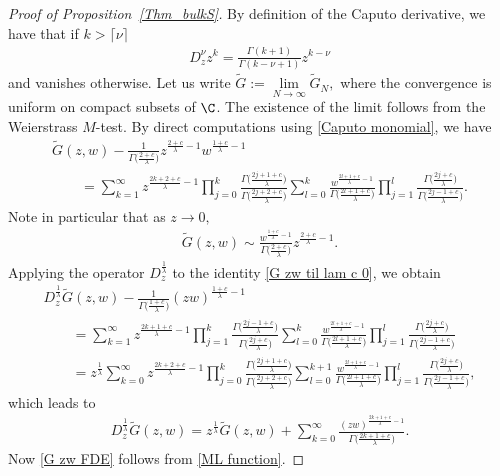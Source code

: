 \begin{proof}[Proof of Proposition~\ref{Thm_bulkS}]
	By definition of the Caputo derivative, we have that if $k>
	\lceil \nu \rceil$
	\begin{gather} \label{Caputo monomial}
		D_z^\nu z^k =\frac{\Gamma(k+1)}{\Gamma(k-\nu+1)}z^{k-\nu}
	\end{gather}
	and vanishes otherwise.
	Let us write $\widetilde{G}:=\lim\limits_{N \to \infty} \widetilde{G}_N,$ where the convergence is uniform on compact subsets of $\C$. The existence of the limit follows from the Weierstrass $M$-test.
	By direct computations using \eqref{Caputo monomial}, we have
	\begin{gather}
\widetilde{G}(z,w)-\frac{1}{\Gamma\big(\frac{2+c}{\lambda}\big)} z^{ \frac{2+c}{\lambda}-1 } w^{ \frac{1+c}{\lambda}-1 }
			\nonumber\\
\qquad{} =\sum_{k=1}^{\infty} z^{ \frac{2k+2+c}{\lambda}-1 } \prod_{j=0}^k \frac{ \Gamma\big( \frac{2j+1+c}{\lambda} \big) }{\Gamma\big( \frac{2j+2+c}{\lambda} \big)}
			\sum_{l=0}^{k} \frac{ w^{ \frac{2l+1+c}{\lambda}-1 } }{\Gamma\big( \frac{2l+1+c}{\lambda}\big)} \prod_{j=1}^l \frac{\Gamma\big( \frac{2j+c}{\lambda} \big)}{ \Gamma\big(\frac{2j-1+c}{\lambda}\big) } .\label{G zw til lam c 0}
		\end{gather}
	Note in particular that as $z\to 0,$
	\begin{gather} \label{G zw til asym}
		\widetilde{G}(z,w) \sim \frac{w^{ \frac{1+c}{\lambda}-1 } }{\Gamma\big(\frac{2+c}{\lambda}\big)} z^{ \frac{2+c}{\lambda}-1 }.
	\end{gather}
	Applying the operator $D_z^{ \frac{1}{\lambda} }$ to the identity \eqref{G zw til lam c 0}, we obtain
	\begin{gather*}
 D_z^{ \frac{1}{\lambda} } \widetilde{G}(z,w)-\frac{ 1}{\Gamma\big( \frac{1+c}{\lambda} \big)}(zw)^{ \frac{1+c}{\lambda}-1 }
		\\
\qquad{} = \sum_{k=1}^{\infty} z^{ \frac{2k+1+c}{\lambda}-1 } \prod_{j=1}^{k}\frac{ \Gamma \big( \frac{2j-1+c}{\lambda} \big) }{\Gamma\big( \frac{2j+c}{\lambda} \big)} \sum_{l=0}^{k} \frac{ w^{ \frac{2l+1+c}{\lambda}-1 } }{\Gamma\big( \frac{2l+1+c}{\lambda} \big)} \prod_{j=1}^l \frac{\Gamma\big(\frac{2j+c}{\lambda}\big) }{ \Gamma\big( \frac{2j-1+c}{\lambda} \big) }
		\\
\qquad{} = z^{ \frac{1}{\lambda} } \sum_{k=0}^{\infty} z^{ \frac{2k+2+c}{\lambda}-1 } \prod_{j=0}^k \frac{ \Gamma \big( \frac{2j+1+c}{\lambda} \big) }{\Gamma\big( \frac{2j+2+c}{\lambda} \big)} \sum_{l=0}^{k+1} \frac{ w^{ \frac{2l+1+c}{\lambda}-1 } }{\Gamma\big( \frac{2l+1+c}{\lambda} \big)} \prod_{j=1}^l \frac{\Gamma\big(\frac{2j+c}{\lambda}\big) }{ \Gamma\big( \frac{2j-1+c}{\lambda} \big) } ,
	\end{gather*}
	which leads to
	\begin{gather*}
		D_z^{ \frac{1}{\lambda} } \widetilde{G}(z,w)= z^{ \frac{1}{\lambda} } \widetilde{G}(z,w)
		+\sum_{k=0}^{\infty} \frac{ (zw)^{ \frac{2k+1+c}{\lambda}-1 } }{\Gamma\big( \frac{2k+1+c}{\lambda} \big)}.
	\end{gather*}
	Now \eqref{G zw FDE} follows from \eqref{ML function}.
	

\end{proof}
